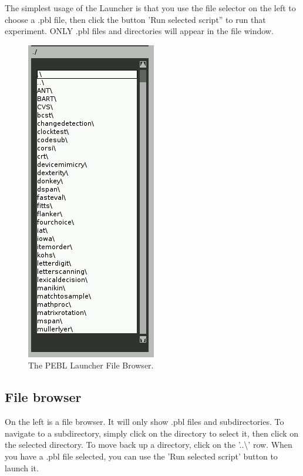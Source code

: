 The simplest usage of the Launcher is that you use the file selector on
the left to choose a .pbl file, then click the button 'Run selected
script'' to run that experiment.  ONLY .pbl files and directories will
appear in the file window.
\clearpage
{}

\begin{figure}
 \vspace{-40pt}
  \begin{center}
    \includegraphics[scale=.5]{filebrowser.png} 
  \end{center}
  \caption{The PEBL Launcher File Browser.}
 \vspace{-50pt}
\end{figure}
\subsection{File browser}
On the left is a file browser.  It will only show .pbl files and
subdirectories.  To navigate to a subdirectory, simply click on the
directory to select it, then click on the selected directory.  To move
back up a directory, click on the '..\textbackslash' row.  When you have a .pbl file
selected, you can use the 'Run selected script' button to launch it.


